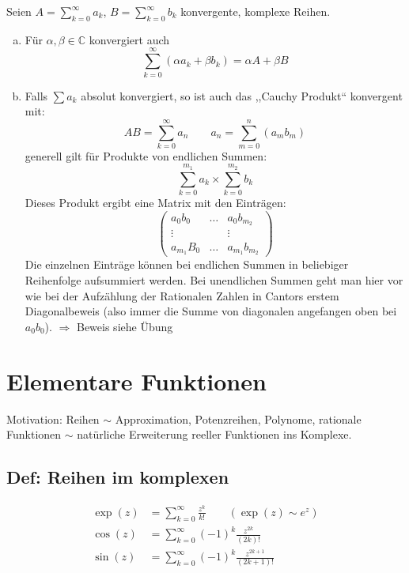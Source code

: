 Seien $ \displaystyle A = \sum_{k=0}^{\infty} a_k $, $ \displaystyle B = \sum_{k=0}^{\infty} b_k $ konvergente, komplexe Reihen.
\begin{enumerate}[a)]
	\item Für $ \alpha, \beta \in \mathbb{C} $ konvergiert auch
	\begin{equation*}
	\sum_{k=0}^{\infty} (\alpha a_k + \beta b_k) = \alpha A + \beta B
	\end{equation*}
	\item Falls $ \sum a_k $ absolut konvergiert, so ist auch das ,,Cauchy Produkt`` konvergent mit:
	\begin{equation*}
	A B = \sum_{k=0}^{\infty} a_n \qquad a_n = \sum_{m=0}^{n} (a_m b_m)
	\end{equation*}
	generell gilt für Produkte von endlichen Summen:
	\begin{equation*}
	\sum_{k=0}^{m_1} a_k \times \sum_{k=0}^{m_2} b_k
	\end{equation*}
	Dieses Produkt ergibt eine Matrix mit den Einträgen:
	\begin{equation*}
	\begin{pmatrix}
	a_{0}b_{0} & \dots & a_0 b_{m_2} \\
	\vdots & & \vdots \\
	a_{m_1}B_0 & \dots & a_{m_1}b_{m_2}
	\end{pmatrix}
	\end{equation*}
	Die einzelnen Einträge können bei endlichen Summen in beliebiger Reihenfolge aufsummiert werden. Bei unendlichen Summen geht man hier vor wie bei der Aufzählung der Rationalen Zahlen in Cantors erstem Diagonalbeweis (also immer die Summe von diagonalen angefangen oben bei $ a_0 b_0 $).
	$ \Rightarrow $ Beweis siehe Übung
\end{enumerate}

\section{Elementare Funktionen}

Motivation: Reihen $ \sim $ Approximation, Potenzreihen, Polynome, rationale Funktionen $ \sim $ natürliche Erweiterung reeller Funktionen ins Komplexe.

\subsection*{Def: Reihen im komplexen}

\begin{align*}
\exp(z) &= \sum_{k=0}^{\infty} \frac{z^k}{k!} \qquad (\exp(z) \sim e^{z}) \\
\cos(z) &= \sum_{k=0}^{\infty} (-1)^k \frac{z^{2k}}{(2k)!} \\
\sin(z) &= \sum_{k=0}^{\infty} (-1)^k \frac{z^{2k+1}}{(2k+1)!}
\end{align*}

